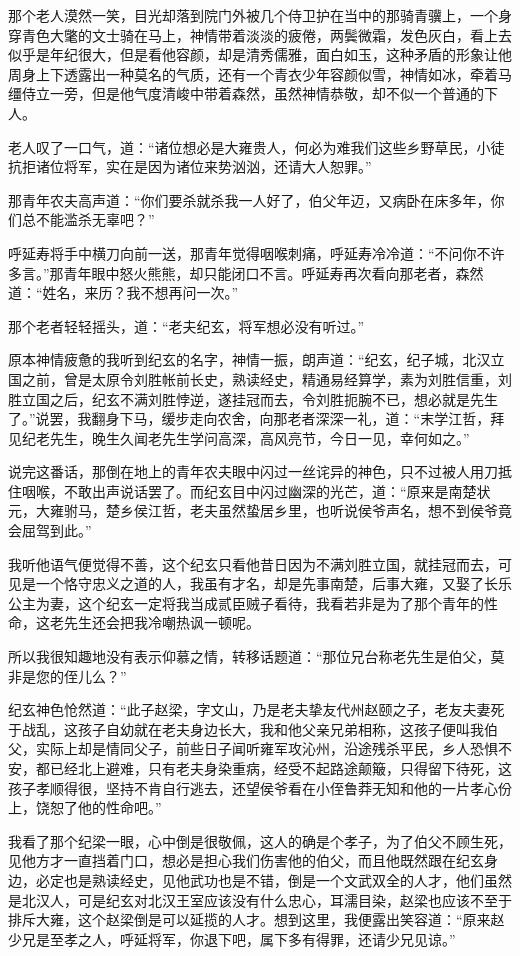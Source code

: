 那个老人漠然一笑，目光却落到院门外被几个侍卫护在当中的那骑青骥上，一个身穿青色大氅的文士骑在马上，神情带着淡淡的疲倦，两鬓微霜，发色灰白，看上去似乎是年纪很大，但是看他容颜，却是清秀儒雅，面白如玉，这种矛盾的形象让他周身上下透露出一种莫名的气质，还有一个青衣少年容颜似雪，神情如冰，牵着马缰侍立一旁，但是他气度清峻中带着森然，虽然神情恭敬，却不似一个普通的下人。

老人叹了一口气，道：“诸位想必是大雍贵人，何必为难我们这些乡野草民，小徒抗拒诸位将军，实在是因为诸位来势汹汹，还请大人恕罪。”

那青年农夫高声道：“你们要杀就杀我一人好了，伯父年迈，又病卧在床多年，你们总不能滥杀无辜吧？”

呼延寿将手中横刀向前一送，那青年觉得咽喉刺痛，呼延寿冷冷道：“不问你不许多言。”那青年眼中怒火熊熊，却只能闭口不言。呼延寿再次看向那老者，森然道：“姓名，来历？我不想再问一次。”

那个老者轻轻摇头，道：“老夫纪玄，将军想必没有听过。”

原本神情疲惫的我听到纪玄的名字，神情一振，朗声道：“纪玄，纪子城，北汉立国之前，曾是太原令刘胜帐前长史，熟读经史，精通易经算学，素为刘胜信重，刘胜立国之后，纪玄不满刘胜悖逆，遂挂冠而去，令刘胜扼腕不已，想必就是先生了。”说罢，我翻身下马，缓步走向农舍，向那老者深深一礼，道：“末学江哲，拜见纪老先生，晚生久闻老先生学问高深，高风亮节，今日一见，幸何如之。”

说完这番话，那倒在地上的青年农夫眼中闪过一丝诧异的神色，只不过被人用刀抵住咽喉，不敢出声说话罢了。而纪玄目中闪过幽深的光芒，道：“原来是南楚状元，大雍驸马，楚乡侯江哲，老夫虽然蛰居乡里，也听说侯爷声名，想不到侯爷竟会屈驾到此。”

我听他语气便觉得不善，这个纪玄只看他昔日因为不满刘胜立国，就挂冠而去，可见是一个恪守忠义之道的人，我虽有才名，却是先事南楚，后事大雍，又娶了长乐公主为妻，这个纪玄一定将我当成贰臣贼子看待，我看若非是为了那个青年的性命，这老先生还会把我冷嘲热讽一顿呢。

所以我很知趣地没有表示仰慕之情，转移话题道：“那位兄台称老先生是伯父，莫非是您的侄儿么？”

纪玄神色怆然道：“此子赵梁，字文山，乃是老夫挚友代州赵颐之子，老友夫妻死于战乱，这孩子自幼就在老夫身边长大，我和他父亲兄弟相称，这孩子便叫我伯父，实际上却是情同父子，前些日子闻听雍军攻沁州，沿途残杀平民，乡人恐惧不安，都已经北上避难，只有老夫身染重病，经受不起路途颠簸，只得留下待死，这孩子孝顺得很，坚持不肯自行逃去，还望侯爷看在小侄鲁莽无知和他的一片孝心份上，饶恕了他的性命吧。”

我看了那个纪梁一眼，心中倒是很敬佩，这人的确是个孝子，为了伯父不顾生死，见他方才一直挡着门口，想必是担心我们伤害他的伯父，而且他既然跟在纪玄身边，必定也是熟读经史，见他武功也是不错，倒是一个文武双全的人才，他们虽然是北汉人，可是纪玄对北汉王室应该没有什么忠心，耳濡目染，赵梁也应该不至于排斥大雍，这个赵梁倒是可以延揽的人才。想到这里，我便露出笑容道：“原来赵少兄是至孝之人，呼延将军，你退下吧，属下多有得罪，还请少兄见谅。”

